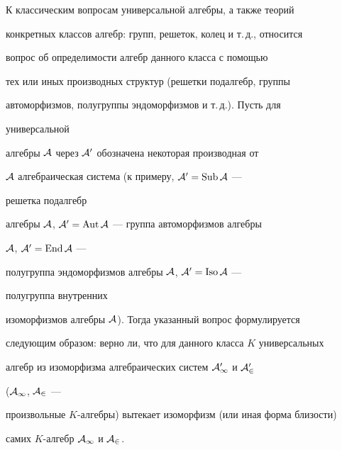  


\date{} 




\pagestyle{plain} %


 




\maketitle 


\label{begin} 


 


К классическим вопросам универсальной алгебры, а также теорий 


конкретных классов алгебр: групп, решеток, колец и т.\,д., относится 


вопрос об определимости алгебр данного класса с помощью 


тех или иных производных структур (решетки подалгебр, группы 


автоморфизмов, полугруппы эндоморфизмов и т.\,д.). Пусть для 


универсальной 


алгебры $\cal A$ через $\cal A'$ обозначена некоторая производная от 


$\cal A$ алгебраическая система (к примеру, $\cal A'=\operatorname{Sub}\cal A$ --- 


решетка подалгебр 


алгебры $\cal A$, $\cal A'=\operatorname{Aut}\cal A$ --- группа автоморфизмов алгебры 


$\cal A$, $\cal A'=\operatorname{End}\cal A$ --- 


полугруппа эндоморфизмов алгебры $\cal A$, $\cal A'=\operatorname{Iso}\cal A$ --- 


полугруппа внутренних 


изоморфизмов алгебры $\cal A$). Тогда указанный вопрос формулируется 


следующим образом: верно ли, что для данного класса $K$ универсальных 


алгебр из изоморфизма алгебраических систем $\cal A'_1$ и $\cal A'_2$ 


($\cal A_1$, $\cal A_2$ --- 


произвольные $K$-алгебры) вытекает изоморфизм (или иная форма близости) 


самих $K$-алгебр $\cal A_1$ и $\cal A_2$. 


